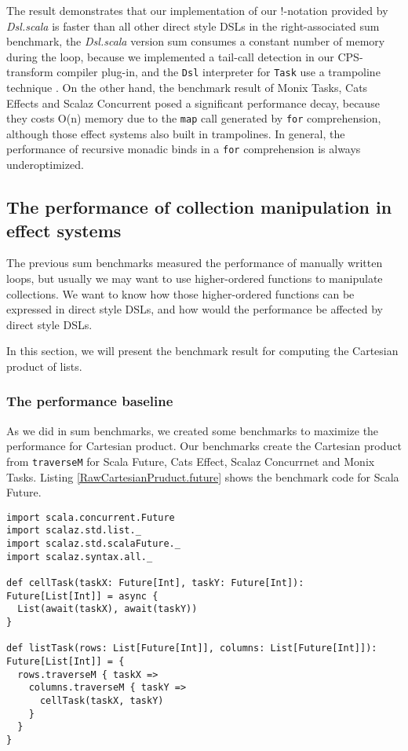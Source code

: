 The result demonstrates that our implementation of our !-notation provided by \textit{Dsl.scala} is faster than all other direct style DSLs in the right-associated sum benchmark, the \textit{Dsl.scala} version sum consumes a constant number of memory during the loop, because we implemented a tail-call detection in our CPS-transform compiler plug-in, and the \lstinline{Dsl} interpreter for \lstinline{Task} use a trampoline technique \cite{tarditi1992no}. On the other hand, the benchmark result of Monix Tasks, Cats Effects and Scalaz Concurrent posed a significant performance decay, because they costs O(n) memory due to the \lstinline{map} call generated by \lstinline{for} comprehension, although those effect systems also built in trampolines. In general, the performance of recursive monadic binds in a \lstinline{for} comprehension is always underoptimized.

\subsection{The performance of collection manipulation in effect systems}

The previous sum benchmarks measured the performance of manually written loops, but usually we may want to use higher-ordered functions to manipulate collections. We want to know how those higher-ordered functions can be expressed in direct style DSLs, and how would the performance be affected by direct style DSLs.

In this section, we will present the benchmark result for computing the Cartesian product of lists.

\subsubsection{The performance baseline}

As we did in sum benchmarks, we created some benchmarks to maximize the performance for Cartesian product. Our benchmarks create the Cartesian product from \lstinline{traverseM} for Scala Future, Cats Effect, Scalaz Concurrnet and Monix Tasks. Listing \ref{RawCartesianPruduct.future} shows the benchmark code for Scala Future.

\begin{lstlisting}[caption={Cartesian product for Scala Future, based on \lstinline{traverseM}},label={RawCartesianPruduct.future}]
import scala.concurrent.Future
import scalaz.std.list._
import scalaz.std.scalaFuture._
import scalaz.syntax.all._

def cellTask(taskX: Future[Int], taskY: Future[Int]): Future[List[Int]] = async {
  List(await(taskX), await(taskY))
}

def listTask(rows: List[Future[Int]], columns: List[Future[Int]]): Future[List[Int]] = {
  rows.traverseM { taskX =>
    columns.traverseM { taskY =>
      cellTask(taskX, taskY)
    }
  }
}
\end{lstlisting}

